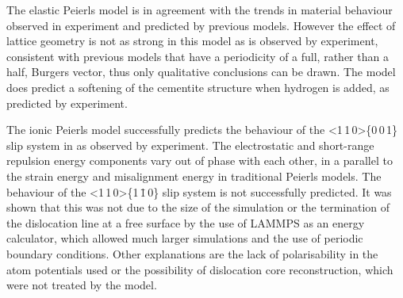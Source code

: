 The elastic Peierls model is in agreement with the trends in material behaviour observed in experiment and predicted by previous models. However the effect of lattice geometry is not as strong in this model as is observed by experiment, consistent with previous models that have a periodicity of a full, rather than a half,  Burgers vector, thus only qualitative conclusions can be drawn. The model does predict a softening of the cementite structure when hydrogen is added, as predicted by experiment.

The ionic Peierls model successfully predicts the behaviour of the <1\,1\,0>\{0\,0\,1\} slip system in  as observed by experiment. The electrostatic and short-range repulsion energy components vary out of phase with each other, in a parallel to the strain energy and misalignment energy in traditional Peierls models. The behaviour of the <1\,1\,0>\{1\,\={1}\,0\} slip system is not successfully predicted. It was shown that this was not due to the size of the simulation or the termination of the dislocation line at a free surface by the use of LAMMPS as an energy calculator, which allowed much larger simulations and the use of periodic boundary conditions. Other explanations are the lack of polarisability in the atom potentials used or the possibility of dislocation core reconstruction, which were not treated by the model.





















